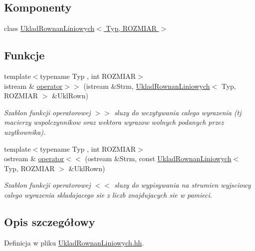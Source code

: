 \subsection*{Komponenty}
\begin{DoxyCompactItemize}
\item 
class \hyperlink{class_uklad_rownan_liniowych}{UkladRownanLiniowych$<$ Typ, ROZMIAR $>$}
\end{DoxyCompactItemize}
\subsection*{Funkcje}
\begin{DoxyCompactItemize}
\item 
{\footnotesize template$<$typename Typ , int ROZMIAR$>$ }\\istream \& \hyperlink{_uklad_rownan_liniowych_8hh_a8466044dc69ceaec3b324caeeb95cb2d}{operator$>$$>$} (istream \&Strm, \hyperlink{class_uklad_rownan_liniowych}{UkladRownanLiniowych}$<$ Typ, ROZMIAR $>$ \&UklRown)
\begin{DoxyCompactList}\small\item\em Szablon funkcji operatorowej $>$$>$ sluzy do wczytywania calego wyrazenia (tj macierzy wspolczynnikow oraz wektora wyrazow wolnych podanych przez uzytkownika). \item\end{DoxyCompactList}\item 
{\footnotesize template$<$typename Typ , int ROZMIAR$>$ }\\ostream \& \hyperlink{_uklad_rownan_liniowych_8hh_aeedb2b3cdaffd4a69b18541d24d94dd1}{operator$<$$<$} (ostream \&Strm, const \hyperlink{class_uklad_rownan_liniowych}{UkladRownanLiniowych}$<$ Typ, ROZMIAR $>$ \&UklRown)
\begin{DoxyCompactList}\small\item\em Szablon funkcji operatorowej $<$$<$ sluzy do wypisywania na strumien wyjsciowy calego wyrazenia skladajacego sie z liczb znajdujacych sie w pamieci. \item\end{DoxyCompactList}\end{DoxyCompactItemize}


\subsection{Opis szczegółowy}


Definicja w pliku \hyperlink{_uklad_rownan_liniowych_8hh_source}{UkladRownanLiniowych.hh}.



